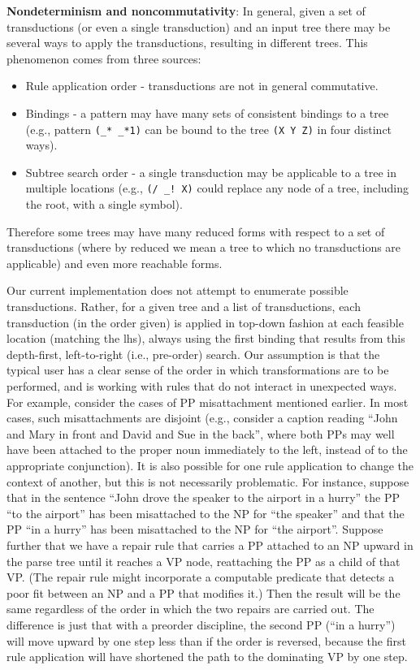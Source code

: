 \documentclass[a4,11pt]{article}
\begin{document}
{\bf Nondeterminism and noncommutativity}:
In general, given a set of transductions (or even a single transduction) and an input tree there may be several ways to apply the transductions, resulting in different trees. This phenomenon comes from three sources:
  \begin{itemize}
  \item Rule application order - transductions are not in general commutative.
  \item Bindings  - a pattern may have many sets of consistent bindings to a tree (e.g., pattern \texttt{(\_* \_*1)} can be bound to the tree \texttt{(X Y Z)} in four distinct ways). 
  \item Subtree search order - a single transduction may be applicable to a tree in multiple locations (e.g., \texttt{(/ \_!~X)} could replace any node of a tree, including the root, with a single symbol).
  \end{itemize}
  Therefore some trees may have many reduced forms with respect to a set of transductions (where by reduced we mean a tree to which no transductions are applicable) and even more reachable forms. 

Our current implementation does not attempt to enumerate possible transductions. Rather, for a given tree and a list of transductions, each transduction (in the order given) is applied in top-down fashion at each feasible location (matching the lhs), always using the first binding that results from this depth-first, left-to-right (i.e., pre-order) search. Our assumption is that the typical user has a clear sense of the order in which transformations are to be performed, and is working with rules that do not interact in unexpected ways. For example, consider the cases of PP misattachment mentioned earlier. In most cases, such misattachments are disjoint (e.g., consider a caption reading ``John and Mary in front and David and Sue in the back'', where both PPs may well have been attached to the proper noun immediately to the left, instead of to the appropriate conjunction). It is also possible for one rule application to change the context of another, but this is not necessarily problematic. For instance, suppose that in the sentence ``John drove the speaker to the airport in a hurry'' the PP ``to the airport'' has been misattached to the NP for ``the speaker'' and that the PP ``in a hurry'' has been misattached to the NP for ``the airport''. Suppose further that we have a repair rule that carries a PP attached to an NP upward in the parse tree until it reaches a VP node, reattaching the PP as a child of that VP. (The repair rule might incorporate a computable predicate that detects a poor fit between an NP and a PP that modifies it.) Then the result will be the same regardless of the order in which the two repairs are carried out. The difference is just that with a preorder discipline, the second PP (``in a hurry'') will move upward by one step less than if the order is reversed, because the first rule application will have shortened the path to the dominating VP by one step.
\end{document}
